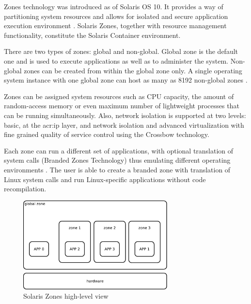 \documentclass[11pt]{book}
\begin{document}
        Zones technology was introduced as of Solaris OS 10. It provides a way of partitioning system resources and
        allows for isolated and secure application execution environment \cite{sag}. Solaris Zones, together with
        resource management functionality, constitute the Solaris Container environment.

        There are two types of zones: global and non-global. Global zone is the default one and is used to execute
        applications as well as to administer the system. Non-global zones can be created from within the global zone
        only. A single operating system instance with one global zone can host as many as 8192 non-global zones
        \cite{sag}.

        Zones can be assigned system resources such as CPU capacity, the amount of random-access memory or even maximum
        number of lightweight processes that can be running simultaneously. Also, network isolation is supported at two
        levels: basic, at the \gls{acr:ip} layer, and network isolation and advanced virtualization with fine grained quality of
        service control using the Crossbow technology.

        Each zone can run a different set of applications, with optional translation of system calls (Branded Zones
        Technology) thus emulating different operating environments \cite{sag}. The user is able to create a branded
        zone with translation of Linux system calls and run Linux-specific applications without code recompilation.

        \begin{figure}[H]
          \begin{center}
            \includegraphics[width=0.7\textwidth]{img/solaris/zones-high-level.pdf}
          \end{center}

          \caption{Solaris Zones high-level view}
        \end{figure}
\end{document}
